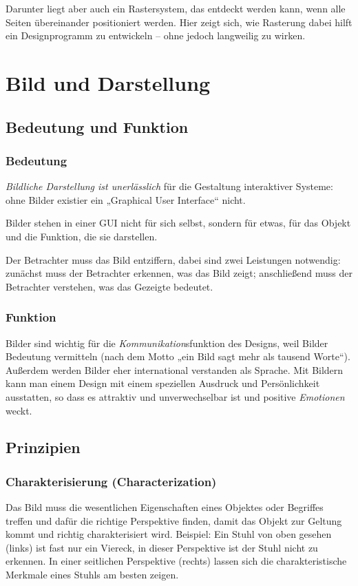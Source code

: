 Darunter liegt aber auch ein Rastersystem, das entdeckt werden kann, wenn alle Seiten übereinander positioniert werden. Hier zeigt sich, wie Rasterung dabei hilft ein Designprogramm zu entwickeln – ohne jedoch langweilig zu wirken.


\section{Bild und Darstellung}
\subsection{Bedeutung und Funktion}
\subsubsection*{Bedeutung}
\emph{Bildliche Darstellung ist unerlässlich} für die Gestaltung interaktiver Systeme: ohne Bilder existier ein „Graphical User Interface“ nicht.

Bilder stehen in einer GUI nicht für sich selbst, sondern für etwas, für das Objekt und die Funktion, die sie darstellen.

Der Betrachter muss das Bild entziffern, dabei sind zwei Leistungen notwendig: zunächst muss der Betrachter erkennen, was das Bild zeigt; anschließend muss der Betrachter verstehen, was das Gezeigte bedeutet.
 
\subsubsection*{Funktion}
Bilder sind wichtig für die \emph{Kommunikation}sfunktion des Designs, weil Bilder Bedeutung vermitteln (nach dem Motto „ein Bild sagt mehr als tausend Worte“). Außerdem werden Bilder eher international verstanden als Sprache.
Mit Bildern kann man einem Design mit einem speziellen Ausdruck und Persönlichkeit ausstatten, so dass es attraktiv und unverwechselbar ist und positive \emph{Emotionen} weckt.

\subsection{Prinzipien}
\subsubsection*{Charakterisierung (Characterization)}
Das Bild muss die wesentlichen Eigenschaften eines Objektes oder Begriffes treffen und dafür die richtige Perspektive finden, damit das Objekt zur Geltung kommt und richtig charakterisiert wird.
Beispiel: Ein Stuhl von oben gesehen (links) ist fast nur ein Viereck, in dieser Perspektive ist der Stuhl nicht zu erkennen. In einer seitlichen Perspektive (rechts) lassen sich die charakteristische Merkmale eines Stuhls am besten zeigen.


